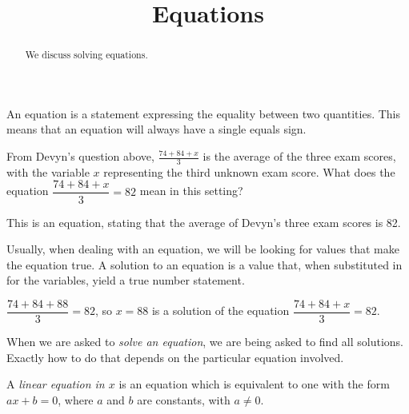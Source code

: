 \documentclass{ximera}
\title[Dig-In:]{Equations}
\begin{document}
\begin{abstract}
  We discuss solving equations.
\end{abstract}
\maketitle

An equation is a statement expressing the equality between two quantities.  This means that an equation will always have a single equals sign.


\begin{example}
  From Devyn's question above, $\displaystyle \frac{74 + 84 + x}{3}$ is the average of the three exam 
  scores, with the variable $x$ representing the third unknown exam score.  What does the equation
  $\displaystyle \dfrac{74 + 84 + x}{3} = 82$ mean in this setting?
  
  \begin{explanation}
    This is an equation, stating that the average of Devyn's three exam scores is 82.
  \end{explanation}
\end{example}

Usually, when dealing with an equation, we will be looking for values that make the equation true.
A solution to an equation is a value that, when substituted in for the variables, yield a true number statement.

\begin{example}
	$\displaystyle \dfrac{74 + 84 + 88}{3} = 82$, so $x = 88$ is a solution of the equation
	$\displaystyle \dfrac{74 + 84 + x}{3} = 82$.
\end{example}

When we are asked to \emph{solve an equation}, we are being asked to find all solutions.
Exactly how to do that depends on the particular equation involved.

A \emph{linear equation in $x$} is an equation which is equivalent to one with the form
$a x + b = 0$, where $a$ and $b$ are constants, with $a \neq 0$.
\end{document}
